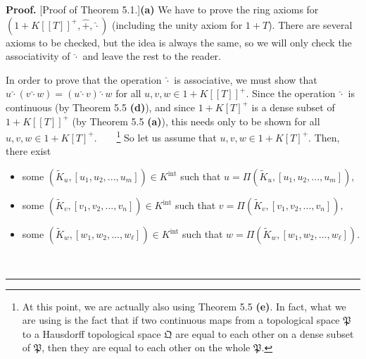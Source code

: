 \documentclass[numbers=enddot,12pt,final,onecolumn,notitlepage]{scrartcl}%
\newenvironment{proof}[1][Proof]{\noindent\textbf{#1.} }{\ \rule{0.5em}{0.5em}}
\begin{document}
\begin{proof}
[Proof of Theorem 5.1.]\textbf{(a)} We have to prove the ring axioms for
$\left(  1+K\left[  \left[  T\right]  \right]  ^{+},\widehat{+},\widehat{\cdot
}\right)  $ (including the unity axiom for $1+T$). There are several axioms to
be checked, but the idea is always the same, so we will only check the
associativity of $\widehat{\cdot}$ and leave the rest to the reader.

In order to prove that the operation $\widehat{\cdot}$ is associative, we must
show that $u\widehat{\cdot}\left(  v\widehat{\cdot}w\right)  =\left(
u\widehat{\cdot}v\right)  \widehat{\cdot}w$ for all $u,v,w\in1+K\left[
\left[  T\right]  \right]  ^{+}$. Since the operation $\widehat{\cdot}$ is
continuous (by Theorem 5.5 \textbf{(d)}), and since $1+K\left[  T\right]
^{+}$ is a dense subset of $1+K\left[  \left[  T\right]  \right]  ^{+}$ (by
Theorem 5.5 \textbf{(a)}), this needs only to be shown for all $u,v,w\in
1+K\left[  T\right]  ^{+}$.\ \ \ \ \footnote{At this point, we are actually
also using Theorem 5.5 \textbf{(e)}. In fact, what we are using is the fact
that if two continuous maps from a topological space $\mathfrak{P}$ to a
Hausdorff topological space $\mathfrak{Q}$ are equal to each other on a dense
subset of $\mathfrak{P}$, then they are equal to each other on the whole
$\mathfrak{P}$.} So let us assume that $u,v,w\in1+K\left[  T\right]  ^{+}$.
Then, there exist

\begin{itemize}
\item some $\left(  \widetilde{K}_{u},\left[  u_{1},u_{2},...,u_{m}\right]
\right)  \in K^{\operatorname*{int}}$ such that $u=\Pi\left(  \widetilde{K}%
_{u},\left[  u_{1},u_{2},...,u_{m}\right]  \right)  ,$

\item some $\left(  \widetilde{K}_{v},\left[  v_{1},v_{2},...,v_{n}\right]
\right)  \in K^{\operatorname*{int}}$ such that $v=\Pi\left(  \widetilde{K}%
_{v},\left[  v_{1},v_{2},...,v_{n}\right]  \right)  ,$

\item some $\left(  \widetilde{K}_{w},\left[  w_{1},w_{2},...,w_{\ell}\right]
\right)  \in K^{\operatorname*{int}}$ such that $w=\Pi\left(  \widetilde{K}%
_{w},\left[  w_{1},w_{2},...,w_{\ell}\right]  \right)  $.
\end{itemize}


\end{proof}
\end{document}
